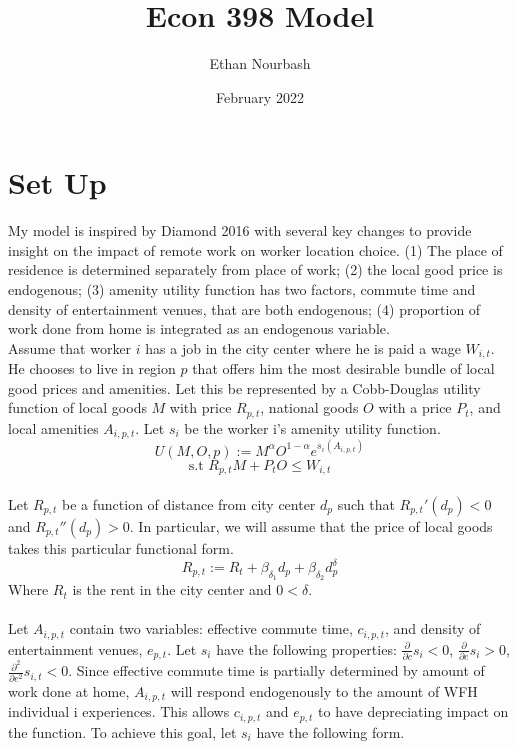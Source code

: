 \documentclass{article}
\title{Econ 398 Model}
\author{Ethan Nourbash}
\date{February 2022}
\begin{document}
\maketitle

\section{Set Up}
My model is inspired by Diamond 2016 with several key changes to provide insight on the impact of remote work on worker location choice. (1) The place of residence is determined separately from place of work; (2) the local good price is endogenous; (3) amenity utility function has two factors, commute time and density of entertainment venues, that are both endogenous; (4) proportion of work done from home is integrated as an endogenous variable.\\
Assume that worker $i$ has a job in the city center where he is paid a wage $W_{i,t}$. He chooses to live in region $p$ that offers him the most desirable bundle of local good prices and amenities. Let this be represented by a Cobb-Douglas utility function of local goods $M$ with price $R_{p,t}$, national goods $O$ with a price $P_t$, and local amenities $A_{i,p,t}$. Let $s_i$ be the worker i's amenity utility function.
\begin{equation}
U(M, O, p) := M^\alpha O^{1-\alpha}e^{s_i(A_{i,p,t})}
\end{equation}
\begin{equation}
\textrm{s.t } R_{p,t}M + P_tO \leq W_{i,t}
\end{equation}
\\
Let $R_{p,t}$ be a function of distance from city center $d_p$ such that $R_{p,t}'(d_p) < 0$ and $R_{p,t}''(d_p) > 0$. In particular, we will assume that the price of local goods takes this particular functional form.
\begin{equation} \label{rent}
R_{p,t} := R_{t} + \beta_{\delta_1} d_p + \beta_{\delta_2} d_p^\delta
\end{equation}
Where $R_{t}$ is the rent in the city center and $0 < \delta$.\\ \\
Let $A_{i,p,t}$ contain two variables: effective commute time, $c_{i,p,t}$, and density of entertainment venues, $e_{p,t}$. Let $s_{i}$ have the following properties: $\frac{\partial}{\partial c}s_{i}<0$, $\frac{\partial}{\partial e}s_{i}>0$, $\frac{\partial^2}{\partial e^2}s_{i,t}<0$. Since effective commute time is partially determined by amount of work done at home, $A_{i,p,t}$ will respond endogenously to the amount of WFH individual i experiences. This allows $c_{i,p,t}$ and $e_{p,t}$ to have depreciating impact on the function. To achieve this goal, let $s_i$ have the following form.
\end{document}
